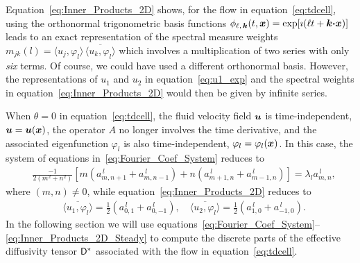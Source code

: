 \documentclass[amsa]{ipart}
\begin{document}
%
Equation~\eqref{eq:Inner_Products_2D} shows, for the flow in
equation~\eqref{eq:tdcell}, using the orthonormal trigonometric
basis 
functions $\phi_{\ell,\,\boldsymbol{k}}(t,\boldsymbol{x})=\exp[\imath(\ell t+\boldsymbol{k}\mbox{\boldmath${\cdot}$}\boldsymbol{x})]$ leads
to an exact representation of the spectral measure weights
$m_{jk}(l)=\langle u_j,\varphi_l\rangle\,\overline{\langle u_k,\varphi_l\rangle}$ which involves a
multiplication of two series with only \emph{six} terms. Of course, we
could have used a different  
orthonormal basis. However, the representations of $u_1$ and $u_2$ in
equation~\eqref{eq:u1_exp} and the spectral weights in
equation~\eqref{eq:Inner_Products_2D} would then be given by infinite
series.     



When $\theta=0$ in equation~\eqref{eq:tdcell}, the fluid velocity field
$\boldsymbol{u}$ is time-independent, $\boldsymbol{u}=\boldsymbol{u}(\boldsymbol{x})$, the operator $A$ no
longer involves the time derivative, and the associated eigenfunction
$\varphi_l$ is also time-independent, $\varphi_l=\varphi_l(\boldsymbol{x})$. In this case, the system
of equations in~\eqref{eq:Fourier_Coef_System} reduces to 
%
\begin{align}\label{eq:Fourier_Coef_System_Steady}
  &\frac{-1}{2(m^2+n^2)}\left[m(a^{\,l}_{m,n+1}+a^{\,l}_{m,n-1})+n(a^{\,l}_{m+1,n}+a^{\,l}_{m-1,n})\right]
  =\lambda_la^{\,l}_{m,n},
\end{align}
%
where $(m,n)\neq0$, while equation~\eqref{eq:Inner_Products_2D} reduces
to  
%
\begin{align}\label{eq:Inner_Products_2D_Steady}
  &\overline{\langle u_1,\varphi_l\rangle}=\frac{1}{2}\left(a^{\,l}_{0,1}+a^{\,l}_{0,-1}\right),
  \quad
  \overline{\langle u_2,\varphi_l\rangle}=\frac{1}{2}\left(a^{\,l}_{1,0}+a^{\,l}_{-1,0}\right).
\end{align}
%
In the following section we will use
equations~\eqref{eq:Fourier_Coef_System}--\eqref{eq:Inner_Products_2D_Steady}
to compute the discrete parts of the effective diffusivity tensor
$\mathsf{D}^*$ associated with the flow in equation~\eqref{eq:tdcell}. 
\end{document}
